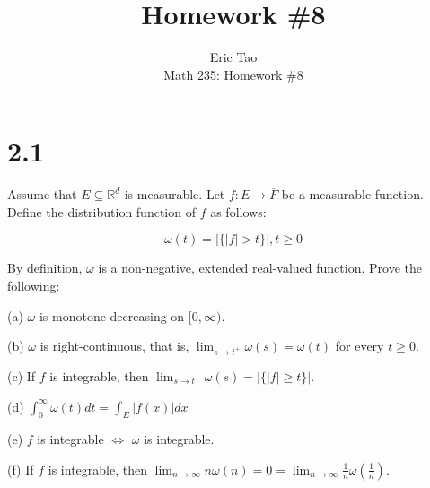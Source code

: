 \documentclass[10pt]{article}
\newenvironment{problem}[2][Problem]{\begin{trivlist}
\item[\hskip \labelsep {\bfseries #1}\hskip \labelsep {\bfseries #2.}]}{\end{trivlist}}
\begin{document}
 
\title{Homework \#8}
\author{Eric Tao\\
Math 235: Homework \#8}
\maketitle
 
\section*{2.1}

\begin{problem}{4.6.21}

Assume that $E \subseteq \mathbb{R}^d$ is measurable. Let $f: E \to \overline{F}$ be a measurable function. Define the distribution function of $f$ as follows:

$$\omega(t) = \left| \{ |f| > t \} \right|, t \geq 0$$

By definition, $\omega$ is a non-negative, extended real-valued function. Prove the following:

(a) $\omega$ is monotone decreasing on $[0,\infty)$.

(b) $\omega$ is right-continuous, that is, $\lim_{s \to t^+} \omega(s) = \omega(t)$ for every $t \geq 0$.

(c) If $f$ is integrable, then $\lim_{s \to t^-} \omega(s) = \left| \{ |f| \geq t \} \right| $.

(d) $\int_0^\infty \omega(t) dt = \int_E |f(x)| dx$

(e) $f$ is integrable $\iff$ $\omega$ is integrable.

(f) If $f$ is integrable, then $\lim_{n \to \infty} n \omega(n) = 0 = \lim_{n \to \infty} \frac{1}{n} \omega(\frac{1}{n})$.

\end{problem}
\end{document}
